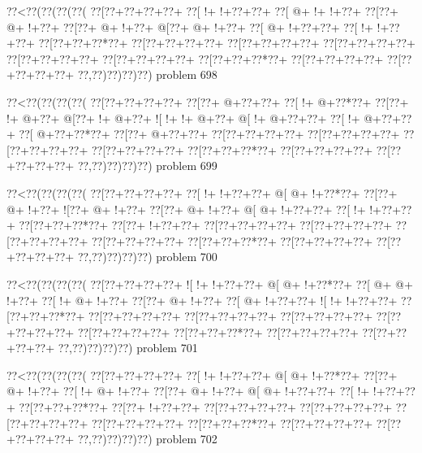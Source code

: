 \vbox{\vbox{\goo
\0??<\0??(\0??(\0??(\0??(
\0??[\0??+\0??+\0??+\0??+
\0??[\- !+\- !+\0??+\0??+
\0??[\- @+\- !+\- !+\0??+
\0??[\0??+\- @+\- !+\0??+
\0??[\0??+\- @+\- !+\0??+
\- @[\0??+\- @+\- !+\0??+
\0??[\- @+\- !+\0??+\0??+
\0??[\- !+\- !+\0??+\0??+
\0??[\0??+\0??+\0??*\0??+
\0??[\0??+\0??+\0??+\0??+
\0??[\0??+\0??+\0??+\0??+
\0??[\0??+\0??+\0??+\0??+
\0??[\0??+\0??+\0??+\0??+
\0??[\0??+\0??+\0??+\0??+
\0??[\0??+\0??+\0??*\0??+
\0??[\0??+\0??+\0??+\0??+
\0??[\0??+\0??+\0??+\0??+
\0??,\0??)\0??)\0??)\0??)
}
\hfil problem 698\hfil\break
}

\vbox{\vbox{\goo
\0??<\0??(\0??(\0??(\0??(
\0??[\0??+\0??+\0??+\0??+
\0??[\0??+\- @+\0??+\0??+
\0??[\- !+\- @+\0??*\0??+
\0??[\0??+\- !+\- @+\0??+
\- @[\0??+\- !+\- @+\0??+
\- ![\- !+\- !+\- @+\0??+
\- @[\- !+\- @+\0??+\0??+
\0??[\- !+\- @+\0??+\0??+
\0??[\- @+\0??+\0??*\0??+
\0??[\0??+\- @+\0??+\0??+
\0??[\0??+\0??+\0??+\0??+
\0??[\0??+\0??+\0??+\0??+
\0??[\0??+\0??+\0??+\0??+
\0??[\0??+\0??+\0??+\0??+
\0??[\0??+\0??+\0??*\0??+
\0??[\0??+\0??+\0??+\0??+
\0??[\0??+\0??+\0??+\0??+
\0??,\0??)\0??)\0??)\0??)
}
\hfil problem 699\hfil\break
}

\vbox{\vbox{\goo
\0??<\0??(\0??(\0??(\0??(
\0??[\0??+\0??+\0??+\0??+
\0??[\- !+\- !+\0??+\0??+
\- @[\- @+\- !+\0??*\0??+
\0??[\0??+\- @+\- !+\0??+
\- ![\0??+\- @+\- !+\0??+
\0??[\0??+\- @+\- !+\0??+
\- @[\- @+\- !+\0??+\0??+
\0??[\- !+\- !+\0??+\0??+
\0??[\0??+\0??+\0??*\0??+
\0??[\0??+\- !+\0??+\0??+
\0??[\0??+\0??+\0??+\0??+
\0??[\0??+\0??+\0??+\0??+
\0??[\0??+\0??+\0??+\0??+
\0??[\0??+\0??+\0??+\0??+
\0??[\0??+\0??+\0??*\0??+
\0??[\0??+\0??+\0??+\0??+
\0??[\0??+\0??+\0??+\0??+
\0??,\0??)\0??)\0??)\0??)
}
\hfil problem 700\hfil\break
}

\vbox{\vbox{\goo
\0??<\0??(\0??(\0??(\0??(
\0??[\0??+\0??+\0??+\0??+
\- ![\- !+\- !+\0??+\0??+
\- @[\- @+\- !+\0??*\0??+
\0??[\- @+\- @+\- !+\0??+
\0??[\- !+\- @+\- !+\0??+
\0??[\0??+\- @+\- !+\0??+
\0??[\- @+\- !+\0??+\0??+
\- ![\- !+\- !+\0??+\0??+
\0??[\0??+\0??+\0??*\0??+
\0??[\0??+\0??+\0??+\0??+
\0??[\0??+\0??+\0??+\0??+
\0??[\0??+\0??+\0??+\0??+
\0??[\0??+\0??+\0??+\0??+
\0??[\0??+\0??+\0??+\0??+
\0??[\0??+\0??+\0??*\0??+
\0??[\0??+\0??+\0??+\0??+
\0??[\0??+\0??+\0??+\0??+
\0??,\0??)\0??)\0??)\0??)
}
\hfil problem 701\hfil\break
}

\vbox{\vbox{\goo
\0??<\0??(\0??(\0??(\0??(
\0??[\0??+\0??+\0??+\0??+
\0??[\- !+\- !+\0??+\0??+
\- @[\- @+\- !+\0??*\0??+
\0??[\0??+\- @+\- !+\0??+
\0??[\- !+\- @+\- !+\0??+
\0??[\0??+\- @+\- !+\0??+
\- @[\- @+\- !+\0??+\0??+
\0??[\- !+\- !+\0??+\0??+
\0??[\0??+\0??+\0??*\0??+
\0??[\0??+\- !+\0??+\0??+
\0??[\0??+\0??+\0??+\0??+
\0??[\0??+\0??+\0??+\0??+
\0??[\0??+\0??+\0??+\0??+
\0??[\0??+\0??+\0??+\0??+
\0??[\0??+\0??+\0??*\0??+
\0??[\0??+\0??+\0??+\0??+
\0??[\0??+\0??+\0??+\0??+
\0??,\0??)\0??)\0??)\0??)
}
\hfil problem 702\hfil\break
}

